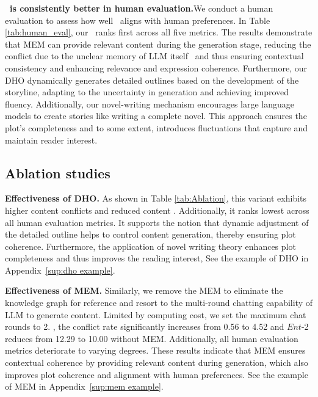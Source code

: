 \textbf{\methodname~is consistently better in human evaluation.}We conduct a human evaluation to assess how well \methodname~aligns with human preferences. In Table \ref{tab:human_eval}, our \methodname~ranks first across all five metrics. The results demonstrate that MEM can provide relevant content during the generation stage, reducing the conflict due to the unclear memory of LLM itself~\cite{zhang2023siren} and thus ensuring contextual consistency and enhancing relevance and expression coherence. Furthermore, our DHO dynamically generates detailed outlines based on the development of the storyline, adapting to the uncertainty in generation and achieving improved fluency. Additionally, our novel-writing mechanism encourages large language models to create stories like writing a complete novel. This approach ensures the plot's completeness and to some extent, introduces fluctuations that capture and maintain reader interest.



\subsection{Ablation studies}

\textbf{Effectiveness of DHO.} As shown in Table \ref{tab:Ablation}, this variant exhibits higher content conflicts and reduced content . Additionally, it ranks lowest across all human evaluation metrics. It supports the notion that dynamic adjustment of the detailed outline helps to control content generation, thereby ensuring plot coherence. Furthermore, the application of novel writing theory enhances plot completeness and thus improves the reading interest,  See the example of DHO in Appendix~\ref{sup:dho example}.



\textbf{Effectiveness of MEM.}
Similarly, we remove the MEM to eliminate the knowledge graph for reference and resort to the multi-round chatting capability of LLM to generate content. Limited by computing cost, we set the maximum chat rounds to 2. , the conflict rate significantly increases from 0.56 to 4.52 and $Ent$-2 reduces from 12.29 to 10.00 without MEM. Additionally, all human evaluation metrics deteriorate to varying degrees. These results indicate that MEM ensures contextual coherence by providing relevant content during generation, which also improves plot coherence and alignment with human preferences. See the example of MEM in Appendix~\ref{sup:mem example}.

